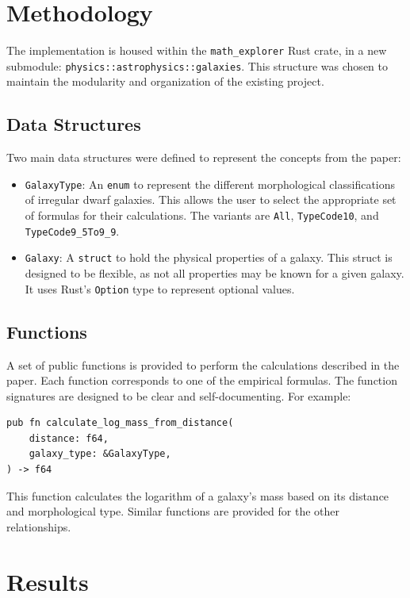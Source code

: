 \documentclass{article}
\begin{document}
\section{Methodology}

The implementation is housed within the \texttt{math\_explorer} Rust crate, in a new submodule: \texttt{physics::astrophysics::galaxies}. This structure was chosen to maintain the modularity and organization of the existing project.

\subsection{Data Structures}

Two main data structures were defined to represent the concepts from the paper:

\begin{itemize}
    \item \texttt{GalaxyType}: An \texttt{enum} to represent the different morphological classifications of irregular dwarf galaxies. This allows the user to select the appropriate set of formulas for their calculations. The variants are \texttt{All}, \texttt{TypeCode10}, and \texttt{TypeCode9\_5To9\_9}.
    \item \texttt{Galaxy}: A \texttt{struct} to hold the physical properties of a galaxy. This struct is designed to be flexible, as not all properties may be known for a given galaxy. It uses Rust's \texttt{Option} type to represent optional values.
\end{itemize}

\subsection{Functions}

A set of public functions is provided to perform the calculations described in the paper. Each function corresponds to one of the empirical formulas. The function signatures are designed to be clear and self-documenting. For example:

\begin{verbatim}
pub fn calculate_log_mass_from_distance(
    distance: f64,
    galaxy_type: &GalaxyType,
) -> f64
\end{verbatim}

This function calculates the logarithm of a galaxy's mass based on its distance and morphological type. Similar functions are provided for the other relationships.

\section{Results}
\end{document}

